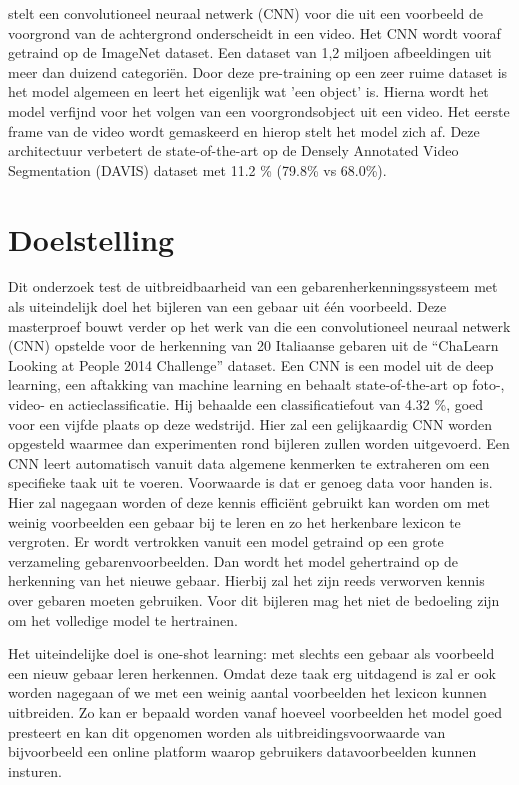 \npar \cite{oneshot-video-segm} stelt een convolutioneel neuraal netwerk (CNN) voor die uit een voorbeeld de voorgrond van de achtergrond onderscheidt in een video. Het CNN wordt vooraf getraind op de ImageNet dataset. Een dataset van 1,2 miljoen afbeeldingen uit meer dan duizend categori\"en. Door deze pre-training op een zeer ruime dataset is het model algemeen en leert het eigenlijk wat 'een object' is. Hierna wordt het model verfijnd voor het volgen van een voorgrondsobject uit een video. Het eerste frame van de video wordt gemaskeerd en hierop stelt het model zich af. Deze architectuur verbetert de state-of-the-art op de Densely Annotated Video Segmentation (DAVIS) dataset met 11.2 \% (79.8\% vs 68.0\%).

\section{Doelstelling}
Dit onderzoek test de uitbreidbaarheid van een gebarenherkenningssysteem met als uiteindelijk doel het bijleren van een gebaar uit \'e\'en voorbeeld.
\npar Deze masterproef bouwt verder op het werk van \cite{lionel} die een convolutioneel neuraal netwerk (CNN) opstelde voor de herkenning van 20 Italiaanse gebaren uit de ``ChaLearn Looking at People 2014 Challenge'' dataset. Een CNN is een model uit de deep learning, een aftakking van machine learning en behaalt state-of-the-art op foto-, video- en actieclassificatie.  Hij behaalde een classificatiefout van 4.32 \%, goed voor een vijfde plaats op deze wedstrijd. Hier zal een gelijkaardig CNN worden opgesteld waarmee dan experimenten rond bijleren zullen worden uitgevoerd.
\npar Een CNN leert automatisch vanuit data algemene kenmerken te extraheren om een specifieke taak uit te voeren. Voorwaarde is dat er genoeg data voor handen is. Hier zal nagegaan worden of deze kennis effici\"ent gebruikt kan worden om met weinig voorbeelden een gebaar bij te leren en zo het herkenbare lexicon te vergroten. Er wordt vertrokken vanuit een model getraind op een grote verzameling gebarenvoorbeelden. Dan wordt het model gehertraind op de herkenning van het nieuwe gebaar. Hierbij zal het zijn reeds verworven kennis over gebaren moeten gebruiken. Voor dit bijleren mag het niet de bedoeling zijn om het volledige model te hertrainen.

\npar  Het uiteindelijke doel is one-shot learning: met slechts een gebaar als voorbeeld een nieuw gebaar leren herkennen.  Omdat deze taak erg uitdagend is zal er ook worden nagegaan of we met een weinig aantal voorbeelden het lexicon kunnen uitbreiden. Zo kan er bepaald worden vanaf hoeveel voorbeelden het model goed presteert en kan dit opgenomen worden als uitbreidingsvoorwaarde van bijvoorbeeld een online platform waarop gebruikers datavoorbeelden kunnen insturen.

